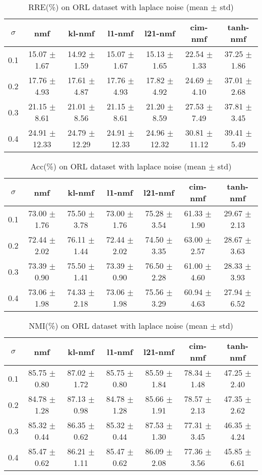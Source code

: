 \documentclass{article} %
\begin{document}
\begin{table}
\begin{tabular}{c|cccccc}$\sigma$ & nmf & kl-nmf & l1-nmf & l21-nmf & cim-nmf & tanh-nmf \\\hline
0.1 & 15.07 $\pm$ 1.67 & 14.92 $\pm$ 1.59 & 15.07 $\pm$ 1.67 & 15.13 $\pm$ 1.65 & 22.54 $\pm$ 1.33 & 37.25 $\pm$ 1.86 \\
0.2 & 17.76 $\pm$ 4.93 & 17.61 $\pm$ 4.87 & 17.76 $\pm$ 4.93 & 17.82 $\pm$ 4.92 & 24.69 $\pm$ 4.10 & 37.01 $\pm$ 2.68 \\
0.3 & 21.15 $\pm$ 8.61 & 21.01 $\pm$ 8.56 & 21.15 $\pm$ 8.61 & 21.20 $\pm$ 8.59 & 27.53 $\pm$ 7.49 & 37.81 $\pm$ 3.45 \\
0.4 & 24.91 $\pm$ 12.33 & 24.79 $\pm$ 12.29 & 24.91 $\pm$ 12.33 & 24.96 $\pm$ 12.32 & 30.81 $\pm$ 11.12 & 39.41 $\pm$ 5.49 \\
\end{tabular}\caption{
  RRE(\%) on ORL dataset with laplace noise (mean $\pm$ std)
  \label{tab:RRE-ORL-laplace}
}\end{table}
\begin{table}
\begin{tabular}{c|cccccc}$\sigma$ & nmf & kl-nmf & l1-nmf & l21-nmf & cim-nmf & tanh-nmf \\\hline
0.1 & 73.00 $\pm$ 1.76 & 75.50 $\pm$ 3.78 & 73.00 $\pm$ 1.76 & 75.28 $\pm$ 3.54 & 61.33 $\pm$ 1.90 & 29.67 $\pm$ 2.13 \\
0.2 & 72.44 $\pm$ 2.02 & 76.11 $\pm$ 1.44 & 72.44 $\pm$ 2.02 & 74.50 $\pm$ 3.35 & 63.00 $\pm$ 2.57 & 28.67 $\pm$ 3.63 \\
0.3 & 73.39 $\pm$ 0.90 & 75.50 $\pm$ 1.41 & 73.39 $\pm$ 0.90 & 76.50 $\pm$ 2.28 & 61.00 $\pm$ 4.60 & 28.33 $\pm$ 3.93 \\
0.4 & 73.06 $\pm$ 1.98 & 74.33 $\pm$ 2.18 & 73.06 $\pm$ 1.98 & 75.56 $\pm$ 3.29 & 60.94 $\pm$ 4.63 & 27.94 $\pm$ 6.52 \\
\end{tabular}\caption{
  Acc(\%) on ORL dataset with laplace noise (mean $\pm$ std)
  \label{tab:Acc-ORL-laplace}
}\end{table}
\begin{table}
\begin{tabular}{c|cccccc}$\sigma$ & nmf & kl-nmf & l1-nmf & l21-nmf & cim-nmf & tanh-nmf \\\hline
0.1 & 85.75 $\pm$ 0.80 & 87.02 $\pm$ 1.72 & 85.75 $\pm$ 0.80 & 85.59 $\pm$ 1.84 & 78.34 $\pm$ 1.48 & 47.25 $\pm$ 2.40 \\
0.2 & 84.78 $\pm$ 1.28 & 87.13 $\pm$ 0.98 & 84.78 $\pm$ 1.28 & 85.66 $\pm$ 1.91 & 78.57 $\pm$ 2.13 & 47.35 $\pm$ 2.62 \\
0.3 & 85.32 $\pm$ 0.44 & 86.35 $\pm$ 0.62 & 85.32 $\pm$ 0.44 & 87.53 $\pm$ 1.30 & 77.31 $\pm$ 3.45 & 46.35 $\pm$ 4.24 \\
0.4 & 85.47 $\pm$ 0.62 & 86.21 $\pm$ 1.11 & 85.47 $\pm$ 0.62 & 86.09 $\pm$ 2.08 & 77.36 $\pm$ 3.56 & 45.85 $\pm$ 6.61 \\
\end{tabular}\caption{
  NMI(\%) on ORL dataset with laplace noise (mean $\pm$ std)
  \label{tab:NMI-ORL-laplace}
}\end{table}
\end{document}
